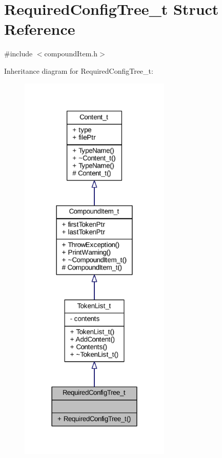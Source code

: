 \hypertarget{struct_required_config_tree__t}{}\section{Required\+Config\+Tree\+\_\+t Struct Reference}
\label{struct_required_config_tree__t}


{\ttfamily \#include $<$compound\+Item.\+h$>$}



Inheritance diagram for Required\+Config\+Tree\+\_\+t\+:
\nopagebreak
\begin{figure}[H]
\begin{center}
\leavevmode
\includegraphics[width=204pt]{struct_required_config_tree__t__inherit__graph}
\end{center}
\end{figure}


